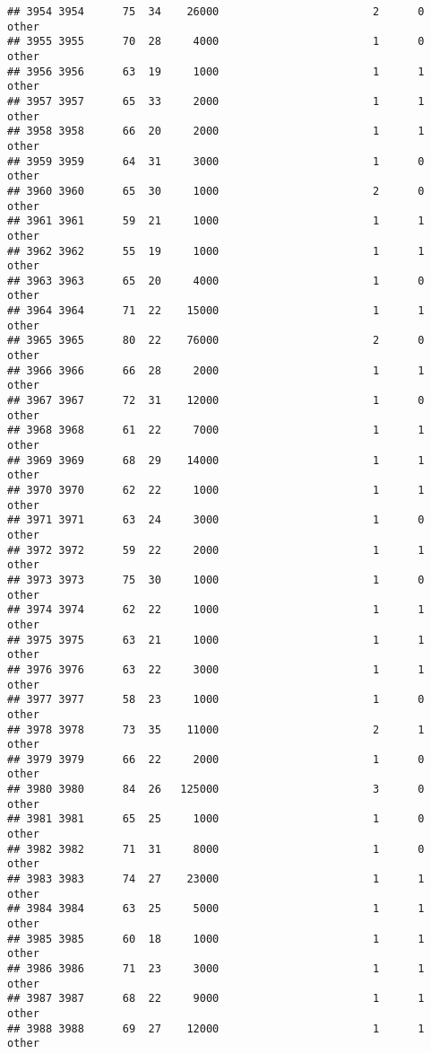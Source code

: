 \documentclass[
]{article}
\begin{document}
\begin{verbatim}
## 3954 3954      75  34    26000                        2      0    other
## 3955 3955      70  28     4000                        1      0    other
## 3956 3956      63  19     1000                        1      1    other
## 3957 3957      65  33     2000                        1      1    other
## 3958 3958      66  20     2000                        1      1    other
## 3959 3959      64  31     3000                        1      0    other
## 3960 3960      65  30     1000                        2      0    other
## 3961 3961      59  21     1000                        1      1    other
## 3962 3962      55  19     1000                        1      1    other
## 3963 3963      65  20     4000                        1      0    other
## 3964 3964      71  22    15000                        1      1    other
## 3965 3965      80  22    76000                        2      0    other
## 3966 3966      66  28     2000                        1      1    other
## 3967 3967      72  31    12000                        1      0    other
## 3968 3968      61  22     7000                        1      1    other
## 3969 3969      68  29    14000                        1      1    other
## 3970 3970      62  22     1000                        1      1    other
## 3971 3971      63  24     3000                        1      0    other
## 3972 3972      59  22     2000                        1      1    other
## 3973 3973      75  30     1000                        1      0    other
## 3974 3974      62  22     1000                        1      1    other
## 3975 3975      63  21     1000                        1      1    other
## 3976 3976      63  22     3000                        1      1    other
## 3977 3977      58  23     1000                        1      0    other
## 3978 3978      73  35    11000                        2      1    other
## 3979 3979      66  22     2000                        1      0    other
## 3980 3980      84  26   125000                        3      0    other
## 3981 3981      65  25     1000                        1      0    other
## 3982 3982      71  31     8000                        1      0    other
## 3983 3983      74  27    23000                        1      1    other
## 3984 3984      63  25     5000                        1      1    other
## 3985 3985      60  18     1000                        1      1    other
## 3986 3986      71  23     3000                        1      1    other
## 3987 3987      68  22     9000                        1      1    other
## 3988 3988      69  27    12000                        1      1    other

\end{verbatim}
\end{document}
